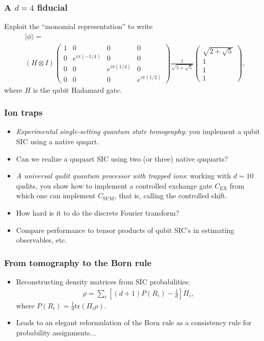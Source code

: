 \documentclass{beamer}
\newcommand{\tr}{{\text{tr}}}
\begin{document}
\begin{frame}
\frametitle{A $d=4$ fiducial}
Exploit the ``monomial representation'' to write
\begin{align}
\label{fiducial}
&|\phi\rangle = \nonumber\\
&	(H \otimes I)\begin{pmatrix}1 & 0 & 0 & 0\\ 0 & e^{i\pi(-1/4)} & 0 & 0 \\ 0 & 0 & e^{i\pi (1/4)} & 0 \\ 0 & 0 & 0 & e^{i\pi (1/2)}\end{pmatrix}\frac{1}{\sqrt{5+\sqrt{5}}}\begin{pmatrix} \sqrt{2+\sqrt{5}} \\ 1 \\ 1 \\ 1 \end{pmatrix},
\end{align}	
where $H$ is the qubit Hadamard gate. 	
\end{frame}

\begin{frame}
\frametitle{Ion traps}
\begin{itemize}
\item \emph{Experimental single-setting quantum state tomography}: you implement a qubit SIC using a native quqart.
\item Can we realize a ququart SIC using two (or three) native ququarts? 
\item \emph{A universal qudit quantum processor with trapped ions}: working with $d=10$ qudits, you show how to implement a controlled exchange gate $C_{\text{EX}}$ from which one can implement $C_{\text{SUM}}$, that is, calling the controlled shift.
\item How hard is it to do the discrete Fourier transform?
\item Compare performance to tensor products of qubit SIC's in estimating observables, etc.
\end{itemize}
	
\end{frame}

\begin{frame}
\frametitle{From tomography to the Born rule}
\begin{itemize}
\item Reconstructing density matrices from SIC probabilities:
\begin{align}
\rho = \sum_i \left[(d+1)P(R_i)- \frac{1}{d}\right]\Pi_i	,
\end{align}
where $P(R_i)=\frac{1}{d}\tr(\Pi_i\rho)$.
\item Leads to an elegant reformulation of the Born rule as a consistency rule for probability assignments...
\end{itemize}
\end{frame}
\end{document}

